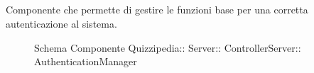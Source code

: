 \subsection{}
Componente che permette di gestire le funzioni base per una corretta autenticazione al sistema.
\begin{figure}[H]
\centering
\noindent{}
\caption[Schema Componente AuthenticationManager]{Schema Componente Quizzipedia:: Server:: ControllerServer:: AuthenticationManager}
\end{figure}
